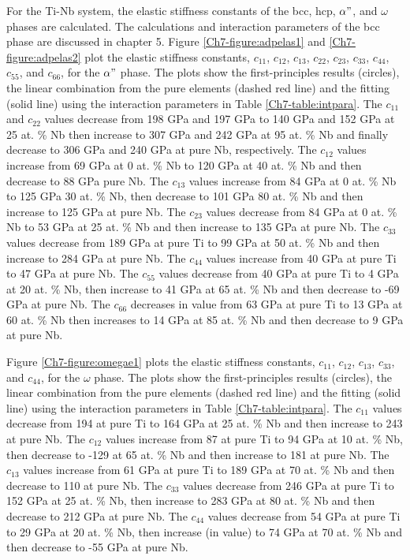 For the Ti-Nb system, the elastic stiffness constants of the bcc, hcp, $\alpha"$, and $\omega$ phases are calculated. The calculations and interaction parameters of the bcc phase are discussed in chapter 5. Figure \ref{Ch7-figure:adpelas1} and \ref{Ch7-figure:adpelas2} plot the elastic stiffness constants, $c_{11}$, $c_{12}$, $c_{13}$, $c_{22}$, $c_{23}$, $c_{33}$, $c_{44}$, $c_{55}$, and $c_{66}$, for the $\alpha"$ phase. The plots show the first-principles results (circles), the linear combination from the pure elements (dashed red line) and the fitting (solid line) using the interaction parameters in Table \ref{Ch7-table:intpara}. The $c_{11}$ and $c_{22}$ values decrease from 198 GPa and 197 GPa to 140 GPa and 152 GPa at 25 at. \% Nb then increase to 307 GPa and 242 GPa at 95 at. \% Nb and finally decrease to 306 GPa and 240 GPa at pure Nb, respectively. The $c_{12}$ values increase from 69 GPa at 0 at. \% Nb to 120 GPa at 40 at. \% Nb and then decrease to 88 GPa pure Nb. The $c_{13}$ values increase from 84 GPa at 0 at. \% Nb to 125 GPa 30 at. \% Nb, then decrease to 101 GPa 80 at. \% Nb and then increase to 125 GPa at pure Nb. The $c_{23}$ values decrease from 84 GPa at 0 at. \% Nb to 53 GPa at 25 at. \% Nb and then increase to 135 GPa at pure Nb. The $c_{33}$ values decrease from 189 GPa at pure Ti to 99 GPa at 50 at. \% Nb and then increase to 284 GPa at pure Nb. The $c_{44}$ values increase from 40 GPa at pure Ti to 47 GPa at pure Nb. The $c_{55}$ values decrease from 40 GPa at pure Ti to 4 GPa at 20 at. \% Nb, then increase to 41 GPa at 65 at. \% Nb and then decrease to -69 GPa at pure Nb. The $c_{66}$ decreases in value from 63 GPa at pure Ti to 13 GPa at 60 at. \% Nb then increases to 14 GPa at 85 at. \% Nb and then decrease to 9 GPa at pure Nb.

Figure \ref{Ch7-figure:omegae1} plots the elastic stiffness constants, $c_{11}$, $c_{12}$, $c_{13}$, $c_{33}$, and $c_{44}$, for the $\omega$ phase. The plots show the first-principles results (circles), the linear combination from the pure elements (dashed red line) and the fitting (solid line) using the interaction parameters in Table \ref{Ch7-table:intpara}. The $c_{11}$ values decrease from 194 at pure Ti to 164 GPa at 25 at. \% Nb and then increase to 243 at pure Nb. The $c_{12}$ values increase from 87 at pure Ti to 94 GPa at 10 at. \% Nb, then decrease to -129 at 65 at. \% Nb and then increase to 181 at pure Nb. The $c_{13}$ values increase from 61 GPa at pure Ti to 189 GPa at 70 at. \% Nb and then decrease to 110 at pure Nb. The $c_{33}$ values decrease from 246 GPa at pure Ti to 152 GPa at 25 at. \% Nb, then increase to 283 GPa at 80 at. \% Nb and then decrease to 212 GPa at pure Nb. The $c_{44}$ values decrease from 54 GPa at pure Ti to 29 GPa at 20 at. \% Nb, then increase (in value) to 74 GPa at 70 at. \% Nb and then decrease to -55 GPa at pure Nb.

